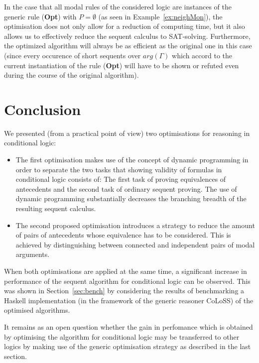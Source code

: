\documentclass{entcs} \usepackage{entcsmacro}
\newcommand{\COLOSS}{{\textrm CoLoSS}}
\begin{document}
\begin{remark}
  In the case that all modal rules of the considered logic are
  instances of the generic rule (\textbf{Opt}) with $P=\emptyset$ (as
  seen in Example~\ref{ex:neighMon}), the optimisation does not only
  allow for a reduction of computing time, but it also allows us to
  effectively reduce the sequent calculus to SAT-solving.
  Furthermore, the optimized algorithm will always be as efficient as
  the original one in this case (since every occurence of short
  sequents over $arg(\Gamma)$ which accord to the current
  instantiation of the rule (\textbf{Opt}) will have to be shown or
  refuted even during the course of the original algorithm).
\end{remark}

\section{Conclusion}  

We presented (from a practical point of view) two optimisations for reasoning
in conditional logic:
\begin{itemize}
\item The first optimisation makes use of the concept of dynamic programming
in order to separate the two tasks that showing validity of formulas in conditional
logic consists of: The first task of proving equivalences of antecedents and the second task
of ordinary sequent proving. The use of dynamic programming substantially decreases the
branching breadth of the resulting sequent calculus.
\item The second proposed optimisation introduces a strategy to reduce the amount
of pairs of antecedents whose equivalence has to be considered. This is achieved
by distinguishing between connected and independent pairs of modal arguments.
\end{itemize}
When both optimisations are applied at the same time, a significant
increase in performance of the sequent algorithm for conditional logic
can be observed.  This was shown in Section~\ref{sec:bench} by
considering the results of benchmarking a Haskell implementation (in
the framework of the generic reasoner \COLOSS) of the optimised
algorithms.

It remains as an open question whether the gain in perfomance which is obtained
by optimising the algorithm for conditional logic may be transferred to other
logics by making use of the generic optimisation strategy as described in the
last section.



\end{document}
